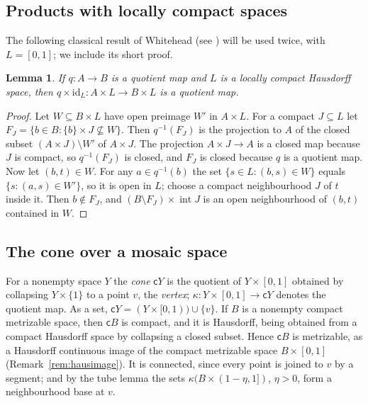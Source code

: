 \documentclass[11pt]{amsart}
\newtheorem{lemma}[theorem]{Lemma}
\theoremstyle{definition}
\theoremstyle{remark}
\newcommand{\cone}{\mathsf{c}}
\numberwithin{equation}{section}
\begin{document}
\subsection{Products with locally compact spaces}
The following classical result of Whitehead (see \cite[Section~3.3]{engelking}) will be used twice, with $L=[0,1]$; we include its short proof.
\begin{lemma}\label{lem:whitehead}
If $q\colon A\to B$ is a quotient map and $L$ is a locally compact Hausdorff space, then $q\times\mathrm{id}_L\colon A\times L\to B\times L$ is a quotient map.
\end{lemma}
\begin{proof}
Let $W\subseteq B\times L$ have open preimage $W'$ in $A\times L$. For a compact $J\subseteq L$ let $F_J=\{b\in B:\{b\}\times J\not\subseteq W\}$. Then $q^{-1}(F_J)$ is the projection to $A$ of the closed subset $(A\times J)\setminus W'$ of $A\times J$. The projection $A\times J\to A$ is a closed map because $J$ is compact, so $q^{-1}(F_J)$ is closed, and $F_J$ is closed because $q$ is a quotient map. Now let $(b,t)\in W$. For any $a\in q^{-1}(b)$ the set $\{s\in L:(b,s)\in W\}$ equals $\{s:(a,s)\in W'\}$, so it is open in $L$; choose a compact neighbourhood $J$ of $t$ inside it. Then $b\notin F_J$, and $(B\setminus F_J)\times\operatorname{int}J$ is an open neighbourhood of $(b,t)$ contained in $W$.
\end{proof}

\subsection{The cone over a mosaic space}
For a nonempty space $Y$ the \emph{cone} $\cone Y$ is the quotient of $Y\times[0,1]$ obtained by collapsing $Y\times\{1\}$ to a point $v$, the \emph{vertex}; $\kappa\colon Y\times[0,1]\to\cone Y$ denotes the quotient map. As a set, $\cone Y=(Y\times[0,1))\cup\{v\}$. If $B$ is a nonempty compact metrizable space, then $\cone B$ is compact, and it is Hausdorff, being obtained from a compact Hausdorff space by collapsing a closed subset. Hence $\cone B$ is metrizable, as a Hausdorff continuous image of the compact metrizable space $B\times[0,1]$ (Remark~\ref{rem:hausimage}). It is connected, since every point is joined to $v$ by a segment; and by the tube lemma the sets $\kappa(B\times(1-\eta,1])$, $\eta>0$, form a neighbourhood base at $v$.
\end{document}
